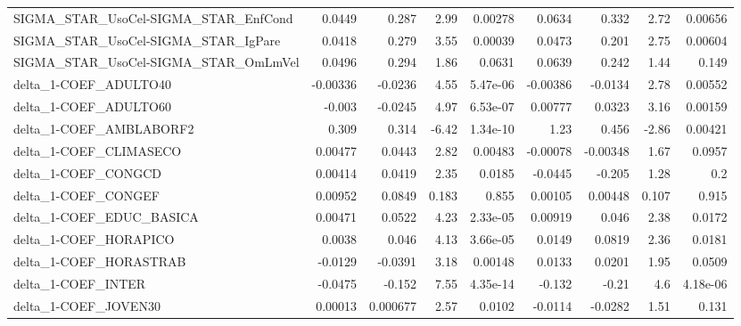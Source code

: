 \begin{tabular}{lrrrrrrrr}
SIGMA\_STAR\_UsoCel-SIGMA\_STAR\_EnfCond  &      0.0449 &        0.287 &     2.99 &  0.00278 &     0.0634 &       0.332 &         2.72 &       0.00656 \\
SIGMA\_STAR\_UsoCel-SIGMA\_STAR\_IgPare   &      0.0418 &        0.279 &     3.55 &  0.00039 &     0.0473 &       0.201 &         2.75 &       0.00604 \\
SIGMA\_STAR\_UsoCel-SIGMA\_STAR\_OmLmVel  &      0.0496 &        0.294 &     1.86 &   0.0631 &     0.0639 &       0.242 &         1.44 &         0.149 \\
delta\_1-COEF\_ADULTO40                 &    -0.00336 &      -0.0236 &     4.55 & 5.47e-06 &   -0.00386 &     -0.0134 &         2.78 &       0.00552 \\
delta\_1-COEF\_ADULTO60                 &      -0.003 &      -0.0245 &     4.97 & 6.53e-07 &    0.00777 &      0.0323 &         3.16 &       0.00159 \\
delta\_1-COEF\_AMBLABORF2               &       0.309 &        0.314 &    -6.42 & 1.34e-10 &       1.23 &       0.456 &        -2.86 &       0.00421 \\
delta\_1-COEF\_CLIMASECO                &     0.00477 &       0.0443 &     2.82 &  0.00483 &   -0.00078 &    -0.00348 &         1.67 &        0.0957 \\
delta\_1-COEF\_CONGCD                   &     0.00414 &       0.0419 &     2.35 &   0.0185 &    -0.0445 &      -0.205 &         1.28 &           0.2 \\
delta\_1-COEF\_CONGEF                   &     0.00952 &       0.0849 &    0.183 &    0.855 &    0.00105 &     0.00448 &        0.107 &         0.915 \\
delta\_1-COEF\_EDUC\_BASICA              &     0.00471 &       0.0522 &     4.23 & 2.33e-05 &    0.00919 &       0.046 &         2.38 &        0.0172 \\
delta\_1-COEF\_HORAPICO                 &      0.0038 &        0.046 &     4.13 & 3.66e-05 &     0.0149 &      0.0819 &         2.36 &        0.0181 \\
delta\_1-COEF\_HORASTRAB                &     -0.0129 &      -0.0391 &     3.18 &  0.00148 &     0.0133 &      0.0201 &         1.95 &        0.0509 \\
delta\_1-COEF\_INTER                    &     -0.0475 &       -0.152 &     7.55 & 4.35e-14 &     -0.132 &       -0.21 &          4.6 &      4.18e-06 \\
delta\_1-COEF\_JOVEN30                  &     0.00013 &     0.000677 &     2.57 &   0.0102 &    -0.0114 &     -0.0282 &         1.51 &         0.131 \\

\end{tabular}
